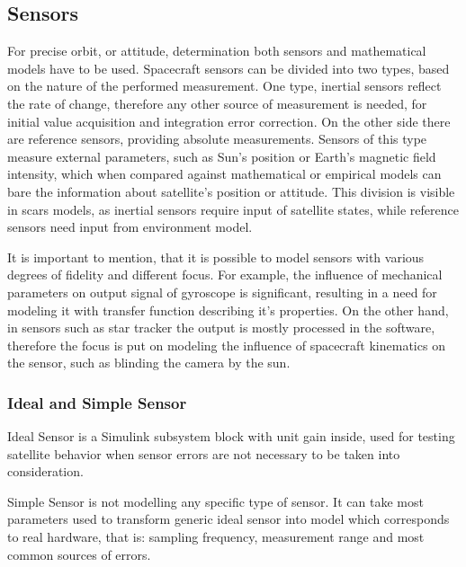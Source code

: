 \subsection{Sensors}
    For precise orbit, or attitude, determination both sensors and mathematical models have to be used. Spacecraft sensors can be divided into two types, based on the nature of the performed measurement. One type, inertial sensors reflect the rate of change, therefore any other source of measurement is needed, for initial value acquisition and integration error correction. On the other side there are reference sensors, providing absolute measurements. Sensors of this type measure external parameters, such as Sun's position or Earth's magnetic field intensity, which when compared against mathematical or empirical models can bare the information about satellite's position or attitude. This division is visible in \ac{scars} models, as inertial sensors require input of satellite states, while reference sensors need input from environment model.

    It is important to mention, that it is possible to model sensors with various degrees of fidelity and different focus. For example, the influence of mechanical parameters on output signal of gyroscope is significant, resulting in a need for modeling it with transfer function describing it's properties. On the other hand, in sensors such as star tracker the output is mostly processed in the software, therefore the focus is put on modeling the influence of spacecraft kinematics on the sensor, such as blinding the camera by the sun.

    \subsubsection{Ideal and Simple Sensor}
        Ideal Sensor is a Simulink subsystem block with unit gain inside, used for testing satellite behavior when sensor errors are not necessary to be taken into consideration.

        Simple Sensor is not modelling any specific type of sensor. It can take most parameters used to transform generic ideal sensor into model which corresponds to real hardware, that is: sampling frequency, measurement range and most common sources of errors.

